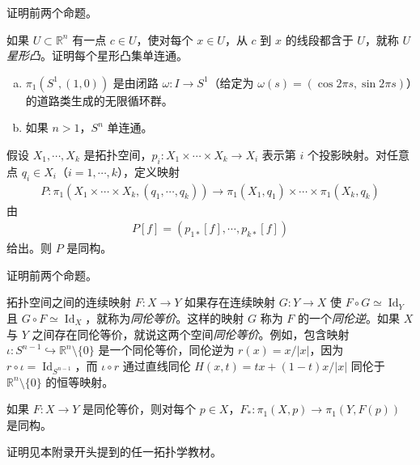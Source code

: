 \documentclass[../../main.tex]{subfiles}
\begin{document}
\begin{exercise}\label{exercise:appA-A-66}
证明前两个命题。
\end{exercise}

\begin{exercise}\label{exercise:appA-A-67}
如果 $U\subset\mathbb R^n$ 有一点 $c\in U$，使对每个 $x\in U$，从 $c$ 到 $x$ 的线段都含于 $U$，就称 $U$ \emph{星形凸}。证明每个星形凸集单连通。
\end{exercise}

\begin{proposition}[球面的基本群]\label{proposition:appA-sphere-fundamental}
\begin{enumerate}[(a)]
\item $\pi_1(S^1,(1,0))$ 是由闭路 $\omega:I\to S^1$（给定为 $\omega(s)=(\cos2\pi s,\sin2\pi s)$）的道路类生成的无限循环群。
\item 如果 $n>1$，$S^n$ 单连通。
\end{enumerate}
\end{proposition}

\begin{proposition}[积空间的基本群]\label{proposition:appA-product-fundamental}
假设 $X_1,\cdots ,X_k$ 是拓扑空间，$p_i:X_1\times\cdots\times X_k\to X_i$ 表示第 $i$ 个投影映射。对任意点 $q_i\in X_i$（$i=1,\cdots ,k$），定义映射
\begin{align*}
P:\pi_1(X_1\times\cdots\times X_k,(q_1,\cdots ,q_k))
\to\pi_1(X_1,q_1)\times\cdots\times\pi_1(X_k,q_k)
\end{align*}
由
\begin{align*}
P[f]=(p_{1*}[f],\cdots ,p_{k*}[f])
\end{align*}
给出。则 $P$ 是同构。
\end{proposition}

\begin{exercise}\label{exercise:appA-A-70}
证明前两个命题。
\end{exercise}

拓扑空间之间的连续映射 $F:X\to Y$ 如果存在连续映射 $G:Y\to X$ 使 $F\circ G\simeq\operatorname{Id}_Y$ 且 $G\circ F\simeq\operatorname{Id}_X$，就称为\emph{同伦等价}。这样的映射 $G$ 称为 $F$ 的一个\emph{同伦逆}。如果 $X$ 与 $Y$ 之间存在同伦等价，就说这两个空间\emph{同伦等价}。例如，包含映射 $\iota:S^{n-1}\hookrightarrow\mathbb R^n\setminus\{0\}$ 是一个同伦等价，同伦逆为 $r(x)=x/|x|$，因为 $r\circ\iota=\operatorname{Id}_{S^{n-1}}$，而 $\iota\circ r$ 通过直线同伦 $H(x,t)=tx+(1-t)x/|x|$ 同伦于 $\mathbb R^n\setminus\{0\}$ 的恒等映射。

\begin{theorem}[同伦不变性]\label{theorem:appA-homotopy-invariance}
如果 $F:X\to Y$ 是同伦等价，则对每个 $p\in X$，$F_*:\pi_1(X,p)\to\pi_1(Y,F(p))$ 是同构。
\end{theorem}

证明见本附录开头提到的任一拓扑学教材。
\end{document}
